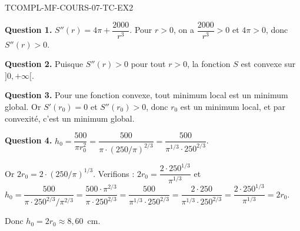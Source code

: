 \begin{corrige}{TCOMPL-MF-COURS-07-TC-EX2}

\textbf{Question 1.} $S''(r) = 4\pi + \dfrac{2000}{r^3}$. Pour $r > 0$, on a $\dfrac{2000}{r^3} > 0$ et $4\pi > 0$, donc $S''(r) > 0$.

\textbf{Question 2.} Puisque $S''(r) > 0$ pour tout $r > 0$, la fonction $S$ est convexe sur $]0, +\infty[$.

\textbf{Question 3.} Pour une fonction convexe, tout minimum local est un minimum global. Or $S'(r_0) = 0$ et $S''(r_0) > 0$, donc $r_0$ est un minimum local, et par convexité, c'est un minimum global.

\textbf{Question 4.} $h_0 = \dfrac{500}{\pi r_0^2} = \dfrac{500}{\pi \cdot (250/\pi)^{2/3}} = \dfrac{500}{\pi^{1/3} \cdot 250^{2/3}}$.

Or $2r_0 = 2 \cdot (250/\pi)^{1/3}$. Verifions : $2r_0 = \dfrac{2 \cdot 250^{1/3}}{\pi^{1/3}}$ et $h_0 = \dfrac{500}{\pi \cdot 250^{2/3}/\pi^{2/3}} = \dfrac{500 \cdot \pi^{2/3}}{\pi \cdot 250^{2/3}} = \dfrac{500}{\pi^{1/3} \cdot 250^{2/3}} = \dfrac{2 \cdot 250}{\pi^{1/3} \cdot 250^{2/3}} = \dfrac{2 \cdot 250^{1/3}}{\pi^{1/3}} = 2r_0$.

Donc $h_0 = 2r_0 \approx 8{,}60$~cm.

\end{corrige}
